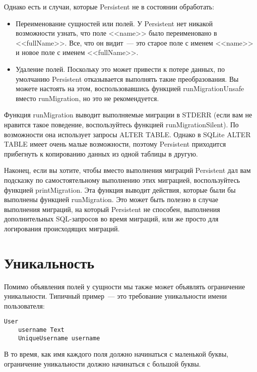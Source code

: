 Однако есть и случаи, которые Persistent не в состоянии обработать:

\begin{itemize}
	\item Переименование сущностей или полей. У Persistent нет никакой возможности узнать, что поле <<name>> было переименовано в <<fullName>>. Все, что он видит~--- это старое поле с именем <<name>> и новое поле с именем <<fullName>>.
	\item Удаление полей. Поскольку это может привести к потере данных, по умолчанию Persistent отказывается выполнять такие преобразования. Вы можете настоять на этом, воспользовавшись функцией runMigrationUnsafe вместо runMigration, но это не рекомендуется.
\end{itemize}

Функция runMigration выводит выполняемые миграции в STDERR (если вам не нравится такое поведение, воспользуйтесь функцией runMigrationSilent). По возможности она использует запросы ALTER TABLE. Однако в SQLite ALTER TABLE имеет очень малые возможности, поэтому Persistent приходится прибегнуть к копированию данных из одной таблицы в другую.

Наконец, если вы хотите, чтобы вместо выполнения миграций Persistent дал вам подсказку по самостоятельному выполнению этих миграцией, воспользуйтесь функцией printMigration. Эта функция выводит действия, которые были бы выполнены функцией runMigration. Это может быть полезно в случае выполнения миграций, на который Persistent не способен, выполнения дополнительных SQL-запросов во время миграций, или же просто для логирования происходящих миграций.

\section{Уникальность} %

Помимо объявления полей у сущности мы также может объявлять ограничение уникальности. Типичный пример~--- это требование уникальности имени пользователя:

\begin{lstlisting}
User
    username Text
    UniqueUsername username
\end{lstlisting}

В то время, как имя каждого поля должно начинаться с маленькой буквы, ограничение уникальности должно начинаться с большой буквы.

